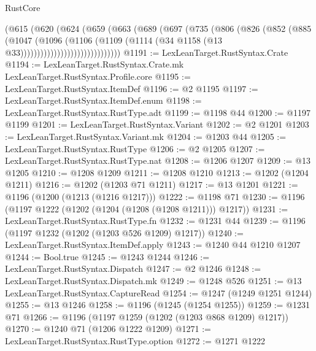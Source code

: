 \begin{lexlean}{RustCore}
\begin{coremodule}
                          (@615
                            (@620
                              (@624
                                (@659
                                  (@663
                                    (@689
                                      (@697
                                        (@735
                                          (@806
                                            (@826
                                              (@852
                                                (@885
                                                  (@1047
                                                    (@1096
                                                      (@1106
                                                        (@1109
                                                          (@1114
                                                            (@34
                                                              @1158
                                                              (@13 @33))))))))))))))))))))))))))))))
@1191 := LexLeanTarget.RustSyntax.Crate
@1194 := LexLeanTarget.RustSyntax.Crate.mk LexLeanTarget.RustSyntax.Profile.core
@1195 := LexLeanTarget.RustSyntax.ItemDef
@1196 := @2 @1195
@1197 := LexLeanTarget.RustSyntax.ItemDef.enum
@1198 := LexLeanTarget.RustSyntax.RustType.adt
@1199 := @1198 @44
@1200 := @1197 @1199
@1201 := LexLeanTarget.RustSyntax.Variant
@1202 := @2 @1201
@1203 := LexLeanTarget.RustSyntax.Variant.mk
@1204 := @1203 @44
@1205 := LexLeanTarget.RustSyntax.RustType
@1206 := @2 @1205
@1207 := LexLeanTarget.RustSyntax.RustType.nat
@1208 := @1206 @1207
@1209 := @13 @1205
@1210 := @1208 @1209
@1211 := @1208 @1210
@1213 := @1202 (@1204 @1211)
@1216 := @1202 (@1203 @71 @1211)
@1217 := @13 @1201
@1221 := @1196 (@1200 (@1213 (@1216 @1217)))
@1222 := @1198 @71
@1230 := @1196 (@1197 @1222 (@1202 (@1204 (@1208 (@1208 @1211))) @1217))
@1231 := LexLeanTarget.RustSyntax.RustType.fn
@1232 := @1231 @44
@1239 := @1196 (@1197 @1232 (@1202 (@1203 @526 @1209) @1217))
@1240 := LexLeanTarget.RustSyntax.ItemDef.apply
@1243 := @1240 @44 @1210 @1207
@1244 := Bool.true
@1245 := @1243 @1244
@1246 := LexLeanTarget.RustSyntax.Dispatch
@1247 := @2 @1246
@1248 := LexLeanTarget.RustSyntax.Dispatch.mk
@1249 := @1248 @526
@1251 := @13 LexLeanTarget.RustSyntax.CaptureRead
@1254 := @1247 (@1249 @1251 @1244)
@1255 := @13 @1246
@1258 := @1196 (@1245 (@1254 @1255))
@1259 := @1231 @71
@1266 := @1196 (@1197 @1259 (@1202 (@1203 @868 @1209) @1217))
@1270 := @1240 @71 (@1206 @1222 @1209)
@1271 := LexLeanTarget.RustSyntax.RustType.option
@1272 := @1271 @1222

\end{coremodule}
\end{lexlean}
